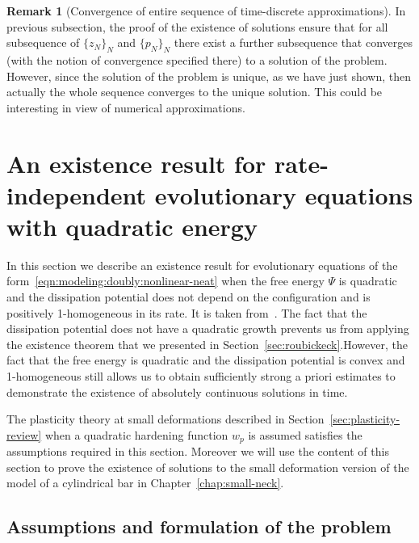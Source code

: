 \documentclass[a4paper,10pt,twoside]{amsbook}
\numberwithin{section}{chapter}
\numberwithin{equation}{chapter}
\theoremstyle{definition}
\newtheorem{rmk}[prop]{Remark}
\begin{document}
\begin{rmk}[Convergence of entire sequence of time-discrete approximations]
In previous subsection, the proof of the existence of solutions ensure that for all subsequence of $\{z_N\}_N$ and $\{p_N\}_N$ there exist a further subsequence that converges (with the notion of convergence specified there) to a solution of the problem. However, since the solution of the problem is unique, as we have just shown, then actually the whole sequence converges to the unique solution. This could be interesting in view of numerical approximations.
\end{rmk}

\section{An existence result for rate-independent evolutionary equations with quadratic energy}
\label{sec:evi}

In this section we describe an existence result for evolutionary equations of the form~\eqref{eqn:modeling:doubly:nonlinear-neat} when the free energy $\Psi$ is quadratic and the dissipation potential does not depend on the configuration and is positively 1-homogeneous in its rate. It is taken from~\cite{han-reddy}. The fact that the dissipation potential does not have a quadratic growth prevents us from applying the existence theorem that we presented in Section~\ref{sec:roubickeck}.However, the fact that the free energy is quadratic and the dissipation potential is convex and 1-homogeneous still allows us to obtain sufficiently strong a priori estimates to demonstrate the existence of absolutely continuous solutions in time.

The plasticity theory at small deformations described in Section~\ref{sec:plasticity-review} when a quadratic hardening function $w_p$ is assumed satisfies the assumptions required in this section. Moreover we will use the content of this section to prove the existence of solutions to the small deformation version of the model of a cylindrical bar in Chapter~\ref{chap:small-neck}.

\subsection{Assumptions and formulation of the problem}
\end{document}
